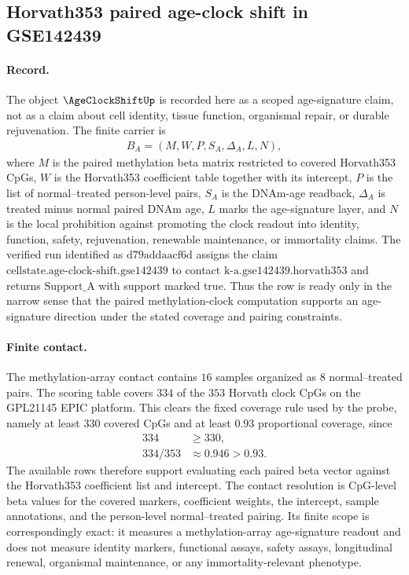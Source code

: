 \subsection{Horvath353 paired age-clock shift in GSE142439}
\label{sec:age-clock-shift-gse142439-horvath353}

\paragraph{Record.}
The object $\AgeClockShiftUp$ is recorded here as a scoped age-signature claim, not as a claim about cell identity, tissue function, organismal repair, or durable rejuvenation. The finite carrier is
$$
\begin{aligned}
B_A=(M,W,P,S_A,\Delta_A,L,N),
\end{aligned}
$$
where $M$ is the paired methylation beta matrix restricted to covered Horvath353 CpGs, $W$ is the Horvath353 coefficient table together with its intercept, $P$ is the list of normal--treated person-level pairs, $S_A$ is the DNAm-age readback, $\Delta_A$ is treated minus normal paired DNAm age, $L$ marks the age-signature layer, and $N$ is the local prohibition against promoting the clock readout into identity, function, safety, rejuvenation, renewable maintenance, or immortality claims. The verified run identified as $\mathrm{d79addaacf6d}$ assigns the claim $\mathrm{cellstate.age\mbox{-}clock\mbox{-}shift.gse142439}$ to contact $\mathrm{k\mbox{-}a.gse142439.horvath353}$ and returns $\mathrm{Support\_A}$ with support marked true. Thus the row is ready only in the narrow sense that the paired methylation-clock computation supports an age-signature direction under the stated coverage and pairing constraints.

\paragraph{Finite contact.}
The methylation-array contact contains $16$ samples organized as $8$ normal--treated pairs. The scoring table covers $334$ of the $353$ Horvath clock CpGs on the GPL21145 EPIC platform. This clears the fixed coverage rule used by the probe, namely at least $330$ covered CpGs and at least $0.93$ proportional coverage, since
$$
\begin{aligned}
334 &\geq 330,\\
334/353 &\approx 0.946 > 0.93.
\end{aligned}
$$
The available rows therefore support evaluating each paired beta vector against the Horvath353 coefficient list and intercept. The contact resolution is CpG-level beta values for the covered markers, coefficient weights, the intercept, sample annotations, and the person-level normal--treated pairing. Its finite scope is correspondingly exact: it measures a methylation-array age-signature readout and does not measure identity markers, functional assays, safety assays, longitudinal renewal, organismal maintenance, or any immortality-relevant phenotype.

